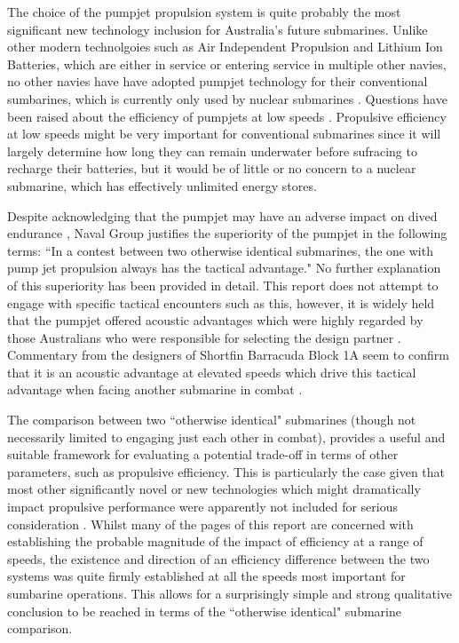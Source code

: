 \documentclass{article}\usepackage[]{graphicx}\usepackage[]{color}
\begin{document}
The choice of the pumpjet propulsion system is quite probably the most significant new technology inclusion for Australia's future submarines.  Unlike other modern technolgoies such as Air Independent Propulsion and Lithium Ion Batteries, which are either in service or entering service in multiple other navies, no other navies have have adopted pumpjet technology for their conventional sumbarines, which is currently only used by nuclear submarines \parencite{coorey2016}.  Questions have been raised about the efficiency of pumpjets at low speeds \parencite{davies2017}. Propulsive efficiency at low speeds might be very important for conventional submarines since it will largely determine how long they can remain underwater before sufracing to recharge their batteries, but it would be of little or no concern to a nuclear submarine, which has effectively unlimited energy stores.

Despite acknowledging that the pumpjet may have an adverse impact on dived endurance \parencite{sbs2017}, Naval Group justifies the superiority of the pumpjet in the following terms: ``In a contest between two otherwise identical submarines, the one with pump jet propulsion always has the tactical advantage."\parencite{guillou2017}  No further explanation of this superiority has been provided in detail.  This report does not attempt to engage with specific tactical encounters such as this, however, it is widely held that the pumpjet offered acoustic advantages which were highly regarded by those Australians who were responsible for selecting the design partner \parencite{stewart2016}.  Commentary from the designers of Shortfin Barracuda Block 1A seem to confirm that it is an acoustic advantage at elevated speeds which drive this tactical advantage when facing another submarine in combat \parencite{autret2016}.

The comparison between two ``otherwise identical" submarines (though not necessarily limited to engaging just each other in combat), provides a useful and suitable framework for evaluating a potential trade-off in terms of other parameters, such as propulsive efficiency.  This is particularly the case given that most other significantly novel or new technologies which might dramatically impact propulsive performance were apparently not included for serious consideration \parencite[10]{stanford2017}.  Whilst many of the pages of this report are concerned with establishing the probable magnitude of the impact of efficiency at a range of speeds, the existence and direction of an efficiency difference between the two systems was quite firmly established at all the speeds most important for sumbarine operations. This allows for a surprisingly simple and strong qualitative conclusion to be reached in terms of the ``otherwise identical" submarine comparison.
\end{document}

